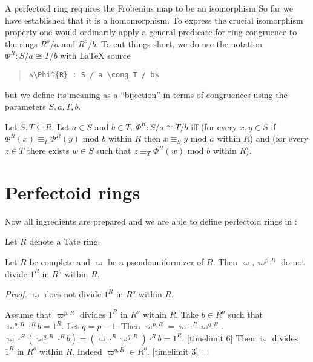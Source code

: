 \documentclass[english,11pt]{article}
\begin{document}
A perfectoid ring requires the Frobenius map to be an isomorphism
So far we have established that it is a homomorphism.
To express the crucial isomorphism  property one would ordinarily 
apply a general predicate for ring congruence to the rings
$R^o/a$ and $R^o/b$. To cut things short, we do use the notation
$\Phi^{R} : S / a \cong T / b$ with 
\LaTeX{} source 
\begin{quotation}
\verb|$\Phi^{R} : S / a \cong T / b$|
\end{quotation}
but we define its meaning as a ``bijection'' in terms of congruences using the 
parameters $S,a,T,b$.
\begin{forthel}

\begin{definition} Let $S,T \subseteq R$. Let $a \in S$ and $b \in T$. 
$\Phi^{R} : S / a \cong T / b$
iff
(for every $x,y \in S$ if 
$\Phi^{R}(x) \equiv_{T} \Phi^{R}(y)$ mod $b$ within $R$ 
then $x \equiv_{S} y$ mod $a$ within $R$)
and
(for every $z \in T$ there exists $w \in S$ such that 
$z \equiv_{T} \Phi^{R}(w)$ mod $b$ within $R$).
\end{definition}

\end{forthel}

\section{Perfectoid rings}

Now all ingredients are prepared and we are able to define
perfectoid rings in \Naproche:

\begin{forthel}

Let $R$ denote a Tate ring.

\begin{lemma}
Let $R$ be complete and $\varpi$ be a pseudouniformizer of $R$.
Then $\varpi, \varpi^{p,R}$ do not divide $1^{R}$ in $R^o$ within $R$.
\end{lemma}
\begin{proof}
$\varpi$ does not divide $1^{R}$ in $R^o$ within $R$.

Assume that $\varpi^{p,R}$ divides $1^{R}$ in $R^o$ within $R$.
Take $b \in R^o$ such that $\varpi^{p,R} \cdot^{R} b = 1^{R}$.
Let $q = p -1$. Then  $\varpi^{p,R} = \varpi \cdot^{R} \varpi^{q,R}$.
$ \varpi \cdot^{R} (\varpi^{q,R} \cdot^{R} b) =
(\varpi \cdot^{R} \varpi^{q,R}) \cdot^{R} b =
1^{R}$.
[timelimit 6] 
Then $\varpi$ divides $1^{R}$ in $R^o$ within $R$. Indeed 
$\varpi^{q,R} \in R^o$.
[timelimit 3]
\end{proof}
\end{forthel}
\end{document}
